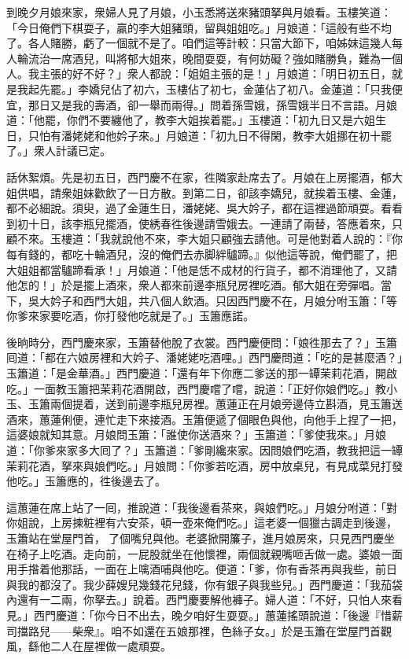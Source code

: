 到晚夕月娘來家，衆婦人見了月娘，小玉悉將送來豬頭拏與月娘看。玉樓笑道：「今日俺們下棋耍子，贏的李大姐豬頭，留與姐姐吃。」月娘道：「這般有些不均了。各人賭勝，虧了一個就不是了。咱們這等計較：只當大節下，咱姊妹這幾人每人輪流治一席酒兒，叫將郁大姐來，晚間耍耍，有何妨礙？強如賭勝負，難為一個人。我主張的好不好？」衆人都說：「姐姐主張的是！」月娘道：「明日初五日，就是我起先罷。」李嬌兒佔了初六，玉樓佔了初七，金蓮佔了初八。金蓮道：「只我便宜，那日又是我的壽酒，卻一舉而兩得。」問着孫雪娥，孫雪娥半日不言語。{}月娘道：「他罷，你們不要纏他了，教李大姐挨着罷。」玉樓道：「初九日又是六姐生日，只怕有潘姥姥和他妗子來。」月娘道：「初九日不得閑，教李大姐挪在初十罷了。」衆人計議已定。

話休絮煩。先是初五日，西門慶不在家，徃隣家赴席去了。月娘在上房擺酒，郁大姐供唱，請衆姐妹歡飲了一日方散。到第二日，卻該李嬌兒，就挨着玉樓、金蓮，都不必細說。須臾，過了金蓮生日，潘姥姥、吳大妗子，都在這裡過節頑耍。看看到初十日，該李瓶兒擺酒，使綉春徃後邊請雪娥去。一連請了兩替，答應着來，只顧不來。{}玉樓道：「我就說他不來，李大姐只顧強去請他。可是他對着人說的：『你每有錢的，都吃十輪酒兒，沒的俺們去赤脚絆驢蹄。』似他這等說，俺們罷了，把大姐姐都當驢蹄看承！」{}月娘道：「他是恁不成材的行貨子，都不消理他了，又請他怎的！」於是擺上酒來，衆人都來前邊李瓶兒房裡吃酒。郁大姐在旁彈唱。當下，吳大妗子和西門大姐，共八個人飲酒。只因西門慶不在，月娘分咐玉簫：「等你爹來家要吃酒，你打發他吃就是了。」玉簫應諾。

後晌時分，西門慶來家，玉簫替他脫了衣裳。西門慶便問：「娘徃那去了？」玉簫囘道：「都在六娘房裡和大妗子、潘姥姥吃酒哩。」西門慶問道：「吃的是甚麼酒？」玉簫道：「是金華酒。」西門慶道：「還有年下你應二爹送的那一罈茉莉花酒，開啟吃。」一面教玉簫把茉莉花酒開啟，西門慶嚐了嚐，說道：「正好你娘們吃。」教小玉、玉簫兩個提着，送到前邊李瓶兒房裡。蕙蓮正在月娘旁邊侍立斟酒，見玉簫送酒來，蕙蓮俐便，連忙走下來接酒。玉簫便遞了個眼色與他，向他手上捏了一把，{}這婆娘就知其意。月娘問玉簫：「誰使你送酒來？」玉簫道：「爹使我來。」月娘道：「你爹來家多大囘了？」玉簫道：「爹剛纔來家。因問娘們吃酒，教我把這一罈茉莉花酒，拏來與娘們吃。」月娘問：「你爹若吃酒，房中放桌兒，有見成菜兒打發他吃。」玉簫應的，徃後邊去了。

這蕙蓮在席上站了一囘，推說道：「我後邊看茶來，與娘們吃。」月娘分咐道：「對你姐說，上房揀粧裡有六安茶，頓一壺來俺們吃。」這老婆一個獵古調走到後邊，玉簫站在堂屋門首，𢫓了個嘴兒與他。老婆掀開簾子，進月娘房來，只見西門慶坐在椅子上吃酒。走向前，一屁股就坐在他懷裡，{}兩個就親嘴咂舌做一處。婆娘一面用手揝着他那話，一面在上噙酒哺與他吃。便道：「爹，你有香茶再與我些，前日與我的都沒了。我少薛嫂兒幾錢花兒錢，你有銀子與我些兒。」{}西門慶道：「我茄袋內還有一二兩，你拏去。」說着。西門慶要解他褲子。婦人道：「不好，只怕人來看見。」西門慶道：「你今日不出去，晚夕咱好生耍耍。」蕙蓮搖頭說道：「後邊『惜薪司擋路兒——柴衆』。咱不如還在五娘那裡，色絲子女。」於是玉簫在堂屋門首觀風，繇他二人在屋裡做一處頑耍。

